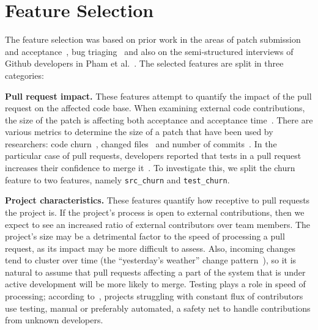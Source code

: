 \documentclass{acm_proc_article-sp}
\begin{document}

\section{Feature Selection}
\label{sec:featureselection}

The feature selection was based on prior work in the areas of patch submission
and acceptance~\cite{Nagap05,Bird07a,Weiss08,Jeong09,Baysa12}, bug
triaging~\cite{Anvik06, Giger10} and also on the semi-structured interviews of
Github developers in Pham et al.~\cite{Pham13}. The selected features are split
in three categories:


  \textbf{Pull request impact.} These
    features attempt to quantify the impact of the
    pull request on the affected code base. When examining external code
    contributions, the size of the patch is affecting both acceptance and
    acceptance time~\cite{Weiss08}. There are various metrics to determine the
    size of a patch that have been used by researchers: code
    churn~\cite{Nagap05, Ratzi07}, changed files~\cite{Nagap05} and number of
    commits~\cite{Fluri07}. In the particular case of pull requests, developers
    reported that tests in a pull request increases their confidence to merge
    it~\cite{Pham13}. To investigate this, we split the churn feature to two
    features, namely \texttt{src\_churn} and \texttt{test\_churn}.

  \textbf{Project characteristics.} These features quantify how receptive to pull
  requests the project is.  If the project's process is open to external
  contributions, then we expect to see an increased ratio of external
  contributors over team members. The project's size may be a detrimental factor
  to the speed of processing a pull request, as its impact may be more difficult
  to assess. Also, incoming changes tend to cluster over time (the
  ``yesterday's weather'' change pattern~\cite{Girba04}), so it is natural to
  assume that pull requests affecting a part of the system that is under active
  development will be more likely to merge.  Testing plays a role in speed of
  processing; according to~\cite{Pham13}, projects struggling with constant flux
  of contributors use testing, manual or preferably automated, a safety net to
  handle contributions from unknown developers.
\end{document}
